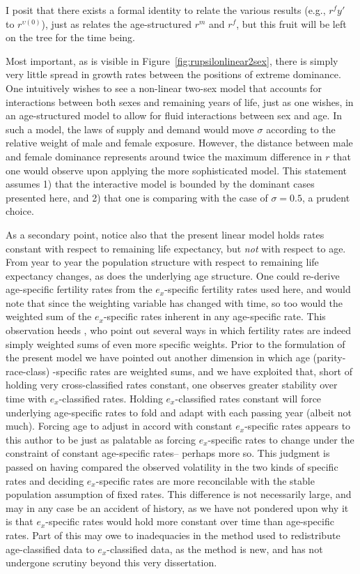 \FloatBarrier
I posit that there exists a formal identity to relate the various results
(e.g., $r^f{y'}$ to $r^{\upsilon (0)}$), just as \citet[pp. 56]{coale1972growth} relates 
the age-structured $r^m$ and $r^f$, but this fruit will be left on the tree
for the time being.

Most important, as is visible in Figure~\ref{fig:rupsilonlinear2sex}, there is
simply very little spread in growth rates between the positions of extreme
dominance. One intuitively wishes to see a non-linear two-sex model that
accounts for interactions between both sexes and remaining years of life, just
as one wishes, in an age-structured model to allow for fluid interactions
between sex and age. In such a model, the laws of supply and demand would move
$\sigma$ according to the relative weight of male and female exposure. However,
the distance between male and female dominance represents around twice the
maximum difference in $r$ that one would observe upon applying the more
sophisticated model. This statement assumes 1) that the interactive model is
bounded by the dominant cases presented here, and 2) that one is comparing with
the case of $\sigma = 0.5$, a prudent choice. 

As a secondary point, notice also that the present linear model holds rates
constant with respect to remaining life expectancy, but \textit{not} with
respect to age. From year to year the population structure with
respect to remaining life expectancy changes, as does the underlying age
structure. One could re-derive age-specific fertility rates from the
$e_x$-specific fertility rates used here, and would note that since the
weighting variable has changed with time, so too would the weighted sum of
the $e_x$-specific rates inherent in any age-specific rate. This observation
heeds \citet{stolnitz1949recent}, who point out several ways in which
fertility rates are indeed simply weighted sums of even more specific weights.
Prior to the formulation of the present model we have pointed out another
dimension in which age (parity-race-class) -specific rates are weighted sums, and we have exploited
that, short of holding very cross-classified rates constant, one observes
greater stability over time with $e_x$-classified rates. Holding
$e_x$-classified rates constant will force underlying age-specific rates to fold
and adapt with each passing year (albeit not much). Forcing age to adjust in
accord with constant $e_x$-specific rates appears to this author to be just as
palatable as forcing $e_x$-specific rates to change under the constraint of
constant age-specific rates-- perhaps more so. This judgment is passed on having
compared the observed volatility in the two kinds of specific rates and deciding
$e_x$-specific rates are more reconcilable with the stable population
assumption of fixed rates. This difference is not necessarily large, and may in
any case be an accident of history, as we have not pondered upon why it is that
$e_x$-specific rates would hold more constant over time than age-specific rates.
Part of this may owe to inadequacies in the method used to redistribute
age-classified data to $e_x$-classified data, as the method is new, and has not
undergone scrutiny beyond this very dissertation.